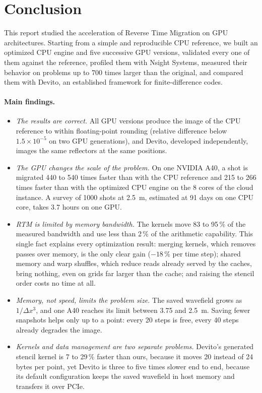 \documentclass[letterpaper,11pt,leqno]{article}
\begin{document}
\section{Conclusion}\label{s:conclusion}

This report studied the acceleration of Reverse Time Migration on GPU
architectures. Starting from a simple and reproducible CPU reference, we built
an optimized CPU engine and five successive GPU versions, validated every one
of them against the reference, profiled them with Nsight Systems, measured
their behavior on problems up to 700 times larger than the original, and
compared them with Devito, an established framework for finite-difference
codes.

\paragraph{Main findings.}
\begin{itemize}
\item \emph{The results are correct.} All GPU versions produce the image of the
  CPU reference to within floating-point rounding (relative difference below
  $1.5\times10^{-5}$ on two GPU generations), and Devito, developed
  independently, images the same reflectors at the same positions.
\item \emph{The GPU changes the scale of the problem.} On one NVIDIA A40, a shot
  is migrated 440 to 540 times faster than with the CPU reference and 215 to 266
  times faster than with the optimized CPU engine on the 8 cores of the cloud
  instance. A survey of 1000 shots at 2.5~m, estimated at 91 days on one CPU
  core, takes 3.7 hours on one GPU.
\item \emph{RTM is limited by memory bandwidth.} The kernels move 83 to 95\,\%
  of the measured bandwidth and use less than 2\,\% of the arithmetic
  capability. This single fact explains every optimization result: merging
  kernels, which removes passes over memory, is the only clear gain ($-18\,\%$
  per time step); shared memory and warp shuffles, which reduce reads already
  served by the caches, bring nothing, even on grids far larger than the cache;
  and raising the stencil order costs no time at all.
\item \emph{Memory, not speed, limits the problem size.} The saved wavefield
  grows as $1/\Delta x^{3}$, and one A40 reaches its limit between 3.75 and
  2.5~m. Saving fewer snapshots helps only up to a point: every 20 steps is
  free, every 40 steps already degrades the image.
\item \emph{Kernels and data management are two separate problems.} Devito's
  generated stencil kernel is 7 to 29\,\% faster than ours, because it moves 20
  instead of 24 bytes per point, yet Devito is three to five times slower end to
  end, because its default configuration keeps the saved wavefield in host
  memory and transfers it over PCIe.
\end{itemize}
\end{document}
